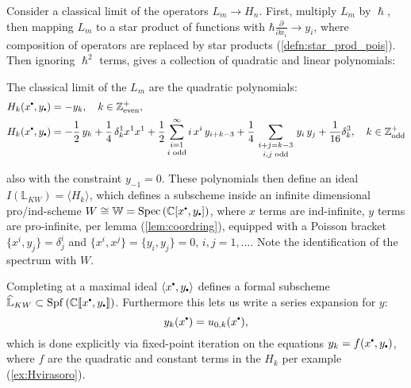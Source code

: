     Consider a classical limit of the operators \(L_m \rightarrow H_n\). First, multiply \(L_m\) by \(\hslash\), then mapping \(L_m\) to a star product of functions with \( \hbar \frac{\partial}{\partial x_i} \rightarrow y_i\), where composition of operators are replaced by star products (\ref{defn:star_prod_pois}). Then ignoring \( \hslash^2\) terms, gives a collection of quadratic and linear polynomials:
    \begin{ex} The classical limit of the \(L_m\) are the quadratic polynomials:
    \label{ex:Hvirasoro} 
    \begin{align*}
        H_k(x^{\sbt},y_{\sbt})&=-y_k,\quad k\in{\mathbb{Z}}^+_{\text{even}},\\
        H_k(x^{\sbt},y_{\sbt})&=-\frac{1}{2} \,y_k +  \frac{1}{4}\,\delta_{k}^{1} x^1 x^1+\frac{1}{2}\mathop{\sum_{i=1}}_{i\text{ odd}}^\infty i\, x^i\, y_{i+k-3} +\frac{1}{4} \, \mathop{\sum_{i+j=k-3}}_{i,j\text{ odd}} \, y_i \, y_j + \frac{1}{16} \delta_{k}^{3} ,  \quad k \in{\mathbb{Z}}^+_{\text{odd}} 
    \end{align*}
    \end{ex}
    also with the constraint \(y_{-1}=0\). These polynomials then define an ideal \( I(\mathbb{L}_{KW})= \langle H_k \rangle \), which defines a subscheme inside an infinite dimensional pro/ind-scheme \( W \cong \mathbb{W}= \Spec\left(\mathbb{C} [ x^{\sbt}, y_{\sbt} ] \right) \), where \(x\) terms are ind-infinite, \(y\) terms are pro-infinite, per lemma (\ref{lem:coordring}), equipped with a Poisson bracket  \(\{x^i,y_j\}=\delta^i_{j}\) and \(\{x^i,x^j\}=\{y_i,y_j\}=0\), \(i,j=1,\dots\).  Note the identification of the spectrum with \(W\).
    
    Completing at a maximal ideal \( \langle x^{\sbt}, y_{\sbt}\rangle\) defines a formal subscheme  \( \widehat{\cL}_{KW} \subset \Spf\left(\mathbb{C} \lBrack x^{\sbt}, y_{\sbt} \rBrack \right)\). Furthermore this lets us write a series expansion for \(y\): 
    \[ y_k(x^{\sbt}) = u_{0,k}(x^{\sbt}),\]
    which is done explicitly via fixed-point iteration on the equations \( y_k = f(x^{\sbt}, y_{\sbt})\), where \(f\) are the quadratic and constant terms in the \(H_k\) per example (\ref{ex:Hvirasoro}). %
    
